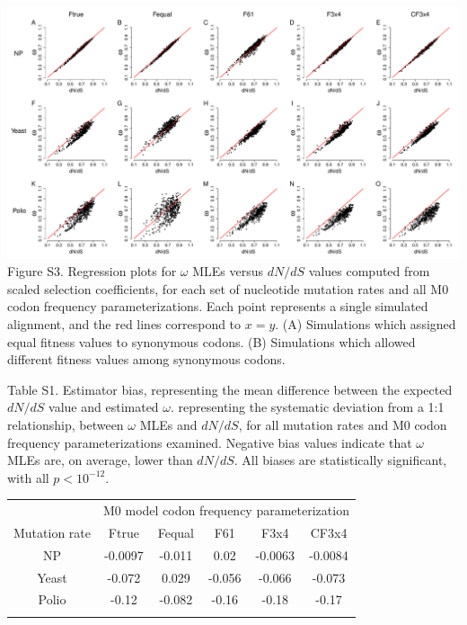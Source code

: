 \documentclass{pnastwo}
\begin{document}
	
\clearpage
\newpage
\begin{landscape}
	
\includegraphics[width=9.25in]{figures/SI/nyp_fspecs_full.pdf}
\noindent Figure S3. Regression plots for $\omega$ MLEs versus $dN/dS$ values computed from scaled selection coefficients, for each set of nucleotide mutation rates and all M0 codon frequency parameterizations. Each point represents a single simulated alignment, and the red lines correspond to $x=y$. (A) Simulations which assigned equal fitness values to synonymous codons. (B) Simulations which allowed different fitness values among synonymous codons.
\end{landscape}

\clearpage
\newpage
	
\noindent Table S1. Estimator bias, representing the mean difference between the expected $dN/dS$ value and estimated $\omega$.  representing the systematic deviation from a 1:1 relationship, between $\omega$ MLEs and $dN/dS$, for all mutation rates and M0 codon frequency parameterizations examined. Negative bias values indicate that $\omega$ MLEs are, on average, lower than $dN/dS$. All biases are statistically significant, with all $p < 10^{-12}$.
\begin{table}[htbp]
	\begin{tabular}{c c c c c c}
		\hline\noalign{\smallskip}
		& \multicolumn{5}{c}{M0 model codon frequency parameterization} \\
		\cline{2-6}\noalign{\medskip}
		Mutation rate & Ftrue & Fequal & F61 & F3x4 & CF3x4 \\
		\hline\noalign{\smallskip}
		NP & -0.0097 & -0.011 & 0.02 & -0.0063 & -0.0084 \\
		Yeast & -0.072 & 0.029 & -0.056 & -0.066 & -0.073 \\
		Polio & -0.12 & -0.082 & -0.16 & -0.18 & -0.17 \\
		\noalign{\smallskip}\hline\noalign{\smallskip}
	\end{tabular}
\end{table}	
	
\end{document}
